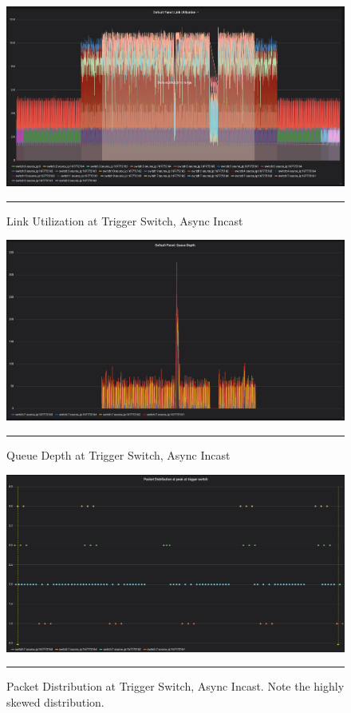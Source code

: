 \begin{figure}[htbp]
	\centering
		\includegraphics[width=1.0\columnwidth]{Figures/link_utilization_async.png}
		\rule{35em}{0.5pt}
	\caption[Link Utilization at Trigger Switch, Async Incast]{Link Utilization at Trigger Switch, Async Incast}
	\label{fig:link_utilization_async}
\end{figure}
\begin{figure}[htbp]
	\centering
		\includegraphics[width=1.0\columnwidth]{Figures/queue_depth_async.png}
		\rule{35em}{0.5pt}
	\caption[Queue Depth at Trigger Switch, Async Incast]{Queue Depth at Trigger Switch, Async Incast}
	\label{fig:queue_depth_async}
\end{figure}
\begin{figure}[htbp]
	\centering
		\includegraphics[width=1.0\columnwidth]{Figures/distribution_async.png}
		\rule{35em}{0.5pt}
	\caption[Packet Distribution at Trigger Switch, Async Incast]{Packet Distribution at Trigger Switch, Async Incast. Note the highly skewed distribution.}
	\label{fig:distribution_async}
\end{figure}


